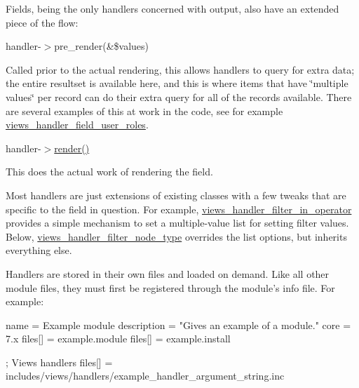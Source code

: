 Fields, being the only handlers concerned with output, also have an extended piece of the flow:


\begin{DoxyItemize}
\item handler-\/$>$pre\_\-render(\&\$values)
\begin{DoxyItemize}
\item Called prior to the actual rendering, this allows handlers to query for extra data; the entire resultset is available here, and this is where items that have \char`\"{}multiple values\char`\"{} per record can do their extra query for all of the records available. There are several examples of this at work in the code, see for example \hyperlink{classviews__handler__field__user__roles}{views\_\-handler\_\-field\_\-user\_\-roles}.
\end{DoxyItemize}
\item handler-\/$>$\hyperlink{common_8inc_a5f4b2009c1caf78549203cec9b324305}{render()}
\begin{DoxyItemize}
\item This does the actual work of rendering the field.
\end{DoxyItemize}
\end{DoxyItemize}

Most handlers are just extensions of existing classes with a few tweaks that are specific to the field in question. For example, \hyperlink{classviews__handler__filter__in__operator}{views\_\-handler\_\-filter\_\-in\_\-operator} provides a simple mechanism to set a multiple-\/value list for setting filter values. Below, \hyperlink{classviews__handler__filter__node__type}{views\_\-handler\_\-filter\_\-node\_\-type} overrides the list options, but inherits everything else.




Handlers are stored in their own files and loaded on demand. Like all other module files, they must first be registered through the module's info file. For example:


\begin{DoxyCode}
 name = Example module
 description = "Gives an example of a module."
 core = 7.x
 files[] = example.module
 files[] = example.install

 ; Views handlers
 files[] = includes/views/handlers/example_handler_argument_string.inc
\end{DoxyCode}


